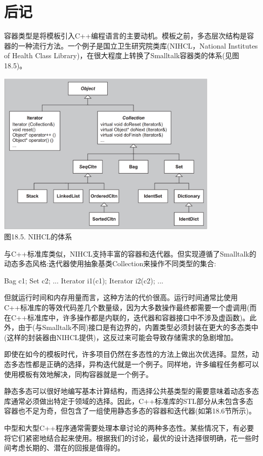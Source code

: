 \section{后记}
容器类型是将模板引入C++编程语言的主要动机。模板之前，多态层次结构是容器的一种流行方法。一个例子是国立卫生研究院类库(NIHCL，National Institutes of Health Class Library)，在很大程度上转换了Smalltalk容器类的体系(见图18.5)。

\begin{center}
\includegraphics[width=0.8\textwidth]{part3/ch18/images/5.png} \\
图18.5. NIHCL的体系
\end{center}

与C++标准库类似，NIHCL支持丰富的容器和迭代器。但实现遵循了Smalltalk的动态多态风格:迭代器使用抽象基类Collection来操作不同类型的集合:

\begin{cpp}
Bag c1;
Set c2;
...
Iterator i1(c1);
Iterator i2(c2);
...
\end{cpp}

但就运行时间和内存用量而言，这种方法的代价很高。运行时间通常比使用C++标准库的等效代码差几个数量级，因为大多数操作最终都需要一个虚调用(而在C++标准库中，许多操作都是内联的，迭代器和容器接口中不涉及虚函数)。此外，由于(与Smalltalk不同)接口是有边界的，内置类型必须封装在更大的多态类中(这样的封装器由NIHCL提供)，这反过来可能会导致存储需求的急剧增加。

即使在如今的模板时代，许多项目仍然在多态性的方法上做出次优选择。显然，动态多态性都是正确的选择，异构迭代就是一个例子。同样地，许多编程任务都可以使用模板有效地解决，同构容器就是一个例子。

静态多态可以很好地编写基本计算结构，而选择公共基类型的需要意味着动态多态库通常必须做出特定于领域的选择。因此，C++标准库的STL部分从未包含多态容器也不足为奇，但包含了一组使用静态多态的容器和迭代器(如第18.6节所示)。

中型和大型C++程序通常需要处理本章讨论的两种多态性。某些情况下，有必要将它们紧密地结合起来使用。根据我们的讨论，最优的设计选择很明确，花一些时间考虑长期的、潜在的回报是值得的。





















